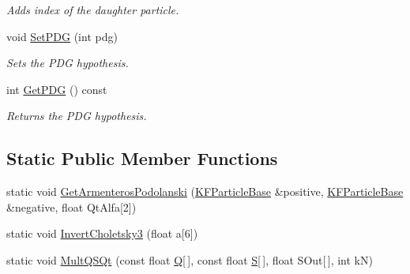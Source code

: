 \begin{DoxyCompactItemize}
\begin{DoxyCompactList}\small\item\em Adds index of the daughter particle. \end{DoxyCompactList}\item 
void \hyperlink{classKFParticleBase_a3acaec6e2b8d7b0e55b37233fd091555}{Set\+P\+DG} (int pdg)\hypertarget{classKFParticleBase_a3acaec6e2b8d7b0e55b37233fd091555}{}\label{classKFParticleBase_a3acaec6e2b8d7b0e55b37233fd091555}

\begin{DoxyCompactList}\small\item\em Sets the P\+DG hypothesis. \end{DoxyCompactList}\item 
int \hyperlink{classKFParticleBase_a03ddf1d1cedebfe9265f89d38cc683f7}{Get\+P\+DG} () const \hypertarget{classKFParticleBase_a03ddf1d1cedebfe9265f89d38cc683f7}{}\label{classKFParticleBase_a03ddf1d1cedebfe9265f89d38cc683f7}

\begin{DoxyCompactList}\small\item\em Returns the P\+DG hypothesis. \end{DoxyCompactList}\end{DoxyCompactItemize}
\subsection*{Static Public Member Functions}
\begin{DoxyCompactItemize}
\item 
static void \hyperlink{classKFParticleBase_a7e78b231b422f5ba25cfb6ab995ed299}{Get\+Armenteros\+Podolanski} (\hyperlink{classKFParticleBase}{K\+F\+Particle\+Base} \&positive, \hyperlink{classKFParticleBase}{K\+F\+Particle\+Base} \&negative, float Qt\+Alfa\mbox{[}2\mbox{]})
\item 
static void \hyperlink{classKFParticleBase_aa0ed9e611a76fd44e0eaac9d6f504929}{Invert\+Choletsky3} (float a\mbox{[}6\mbox{]})
\item 
static void \hyperlink{classKFParticleBase_a150d29c9d64909e4783a4b5c227a9046}{Mult\+Q\+S\+Qt} (const float \hyperlink{classKFParticleBase_ae4a7bf3ab7512c1ac0110e5c405334c9}{Q}\mbox{[}$\,$\mbox{]}, const float \hyperlink{classKFParticleBase_af9ce6c2176599a02337b472064232841}{S}\mbox{[}$\,$\mbox{]}, float S\+Out\mbox{[}$\,$\mbox{]}, int kN)
\end{DoxyCompactItemize}
